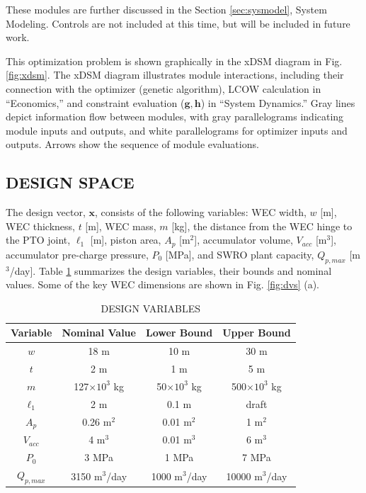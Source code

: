 \documentclass[twocolumn,10pt]{asme2e}
\begin{document}
\FloatBarrier
\noindent These modules are further discussed in the Section \ref{sec:sysmodel}, System Modeling. Controls are not included at this time, but will be included in future work.

This optimization problem is shown graphically in the xDSM diagram \cite{xdsm} in Fig. \ref{fig:xdsm}. The xDSM diagram illustrates module interactions, including their connection with the optimizer (genetic algorithm), LCOW calculation in “Economics,” and constraint evaluation ($\mathbf{g},\mathbf{h}$) in “System Dynamics.” Gray lines depict information flow between modules, with gray parallelograms indicating module inputs and outputs, and white parallelograms for optimizer inputs and outputs. Arrows show the sequence of module evaluations.

\vspace{-1em}
\subsection{DESIGN SPACE}
The design vector, $\mathbf{x}$, consists of the following variables: WEC width, $w$ [m], WEC thickness, $t$ [m], WEC mass, $m$ [kg], the distance from the WEC hinge to the PTO joint, $\ell_1$ [m], piston area, $A_p$ [m$^2$], accumulator volume, $V_{acc}$ [m$^3$], accumulator pre-charge pressure, $P_0$ [MPa], and SWRO plant capacity, $Q_{p,max}$ [m$^3$/day]. Table \ref{tab:design_space} summarizes the design variables, their bounds and nominal values. Some of the key WEC dimensions are shown in Fig. \ref{fig:dvs} (a).
\begin{table}[h]
    \centering
    \caption{DESIGN VARIABLES}
    \begin{tabular}{cccc}
        \hline
        Variable & Nominal Value & Lower Bound & Upper Bound\\
        \hline
        $w$ & 18 m & 10 m & 30 m \\
        $t$ & 2 m & 1 m & 5 m \\
        $m$ & 127$\times10^3$ kg & 50$\times10^3$ kg & 500$\times10^3$ kg \\
        $\ell_1$ & 2 m & 0.1 m & draft \\
        $A_p$ & 0.26 m$^2$ & 0.01 m$^2$ & 1 m$^2$ \\
        $V_{acc}$ & 4 m$^3$ & 0.01 m$^3$ & 6 m$^3$ \\
        $P_0$ & 3 MPa & 1 MPa & 7 MPa \\
        $Q_{p,max}$ & 3150 m$^3$/day & 1000 m$^3$/day & 10000 m$^3$/day\\
        \hline
    \end{tabular}
    \label{tab:design_space} 
\end{table}
\end{document}
